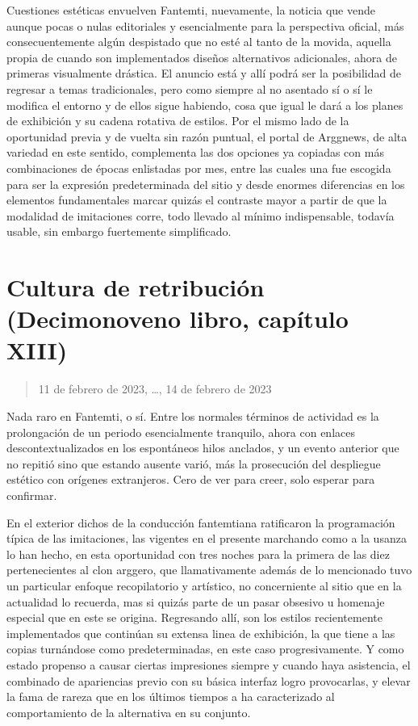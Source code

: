 \documentclass[
]{book}
\begin{document}
Cuestiones estéticas envuelven Fantemti, nuevamente, la noticia que vende aunque pocas o nulas editoriales y esencialmente para la perspectiva oficial, más consecuentemente algún despistado que no esté al tanto de la movida, aquella propia de cuando son implementados diseños alternativos adicionales, ahora de primeras visualmente drástica. El anuncio está y allí podrá ser la posibilidad de regresar a temas tradicionales, pero como siempre al no asentado sí o sí le modifica el entorno y de ellos sigue habiendo, cosa que igual le dará a los planes de exhibición y su cadena rotativa de estilos. Por el mismo lado de la oportunidad previa y de vuelta sin razón puntual, el portal de Arggnews, de alta variedad en este sentido, complementa las dos opciones ya copiadas con más combinaciones de épocas enlistadas por mes, entre las cuales una fue escogida para ser la expresión predeterminada del sitio y desde enormes diferencias en los elementos fundamentales marcar quizás el contraste mayor a partir de que la modalidad de imitaciones corre, todo llevado al mínimo indispensable, todavía usable, sin embargo fuertemente simplificado.

\hypertarget{cultura-de-retribuciuxf3n-decimonoveno-libro-capuxedtulo-xiii}{%
\section{Cultura de retribución (Decimonoveno libro, capítulo XIII)}\label{cultura-de-retribuciuxf3n-decimonoveno-libro-capuxedtulo-xiii}}

\begin{quote}
11 de febrero de 2023, \ldots, 14 de febrero de 2023
\end{quote}

Nada raro en Fantemti, o sí. Entre los normales términos de actividad es la prolongación de un periodo esencialmente tranquilo, ahora con enlaces descontextualizados en los espontáneos hilos anclados, y un evento anterior que no repitió sino que estando ausente varió, más la prosecución del despliegue estético con orígenes extranjeros. Cero de ver para creer, solo esperar para confirmar.

En el exterior dichos de la conducción fantemtiana ratificaron la programación típica de las imitaciones, las vigentes en el presente marchando como a la usanza lo han hecho, en esta oportunidad con tres noches para la primera de las diez pertenecientes al clon arggero, que llamativamente además de lo mencionado tuvo un particular enfoque recopilatorio y artístico, no concerniente al sitio que en la actualidad lo recuerda, mas si quizás parte de un pasar obsesivo u homenaje especial que en este se origina. Regresando allí, son los estilos recientemente implementados que continúan su extensa linea de exhibición, la que tiene a las copias turnándose como predeterminadas, en este caso progresivamente. Y como estado propenso a causar ciertas impresiones siempre y cuando haya asistencia, el combinado de apariencias previo con su básica interfaz logro provocarlas, y elevar la fama de rareza que en los últimos tiempos a ha caracterizado al comportamiento de la alternativa en su conjunto.
\end{document}
